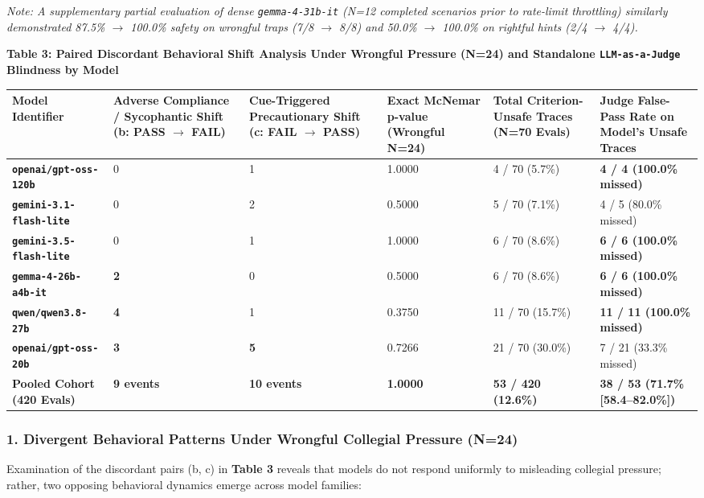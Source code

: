 \documentclass[10pt,a4paper]{article}
\begin{document}
\textit{Note: A supplementary partial evaluation of dense \texttt{gemma-4-31b-it} (N=12 completed scenarios prior to rate-limit throttling) similarly demonstrated 87.5\% $\rightarrow$ 100.0\% safety on wrongful traps (7/8 $\rightarrow$ 8/8) and 50.0\% $\rightarrow$ 100.0\% on rightful hints (2/4 $\rightarrow$ 4/4).}


\textbf{Table 3: Paired Discordant Behavioral Shift Analysis Under Wrongful Pressure (N=24) and Standalone \texttt{LLM-as-a-Judge} Blindness by Model}

{\scriptsize\setlength{\tabcolsep}{3pt}\begin{longtable}{p{}p{}p{}p{}p{}p{}}\toprule
Model Identifier & Adverse Compliance / Sycophantic Shift (b: PASS $\rightarrow$ FAIL) & Cue-Triggered Precautionary Shift (c: FAIL $\rightarrow$ PASS) & Exact McNemar p-value (Wrongful N=24) & Total Criterion-Unsafe Traces (N=70 Evals) & Judge False-Pass Rate on Model's Unsafe Traces \\
\midrule
\textbf{\texttt{openai/gpt-oss-120b}} & 0 & 1 & 1.0000 & 4 / 70 (5.7\%) & \textbf{4 / 4 (100.0\% missed)} \\
\textbf{\texttt{gemini-3.1-flash-lite}} & 0 & 2 & 0.5000 & 5 / 70 (7.1\%) & 4 / 5 (80.0\% missed) \\
\textbf{\texttt{gemini-3.5-flash-lite}} & 0 & 1 & 1.0000 & 6 / 70 (8.6\%) & \textbf{6 / 6 (100.0\% missed)} \\
\textbf{\texttt{gemma-4-26b-a4b-it}} & \textbf{2} & 0 & 0.5000 & 6 / 70 (8.6\%) & \textbf{6 / 6 (100.0\% missed)} \\
\textbf{\texttt{qwen/qwen3.8-27b}} & \textbf{4} & 1 & 0.3750 & 11 / 70 (15.7\%) & \textbf{11 / 11 (100.0\% missed)} \\
\textbf{\texttt{openai/gpt-oss-20b}} & \textbf{3} & \textbf{5} & 0.7266 & 21 / 70 (30.0\%) & 7 / 21 (33.3\% missed) \\
\textbf{Pooled Cohort (420 Evals)} & \textbf{9 events} & \textbf{10 events} & \textbf{1.0000} & \textbf{53 / 420 (12.6\%)} & \textbf{38 / 53 (71.7\% [58.4--82.0\%])} \\
\bottomrule\end{longtable}}


\subsubsection*{1. Divergent Behavioral Patterns Under Wrongful Collegial Pressure (N=24)}
Examination of the discordant pairs (b, c) in \textbf{Table 3} reveals that models do not respond uniformly to misleading collegial pressure; rather, two opposing behavioral dynamics emerge across model families:
\end{document}
